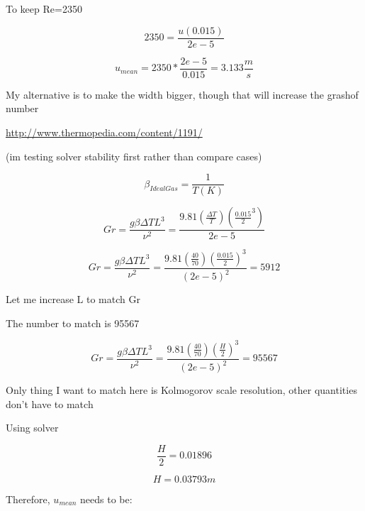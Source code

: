 \documentclass[12pt]{article}
\renewcommand{\_}{\kern-1.5pt\textunderscore\kern-1.5pt}
\begin{document}
To keep Re=2350\par

 \[ 2350=\frac{u \left( 0.015 \right) }{2e-5 } \] \par

 \[ u_{mean}=2350\ast\frac{2e-5}{0.015}=3.133\frac{m}{s} \] \par

My alternative is to make the width bigger, though that will increase the grashof number\par


\vspace{\baselineskip}
\href{http://www.thermopedia.com/content/1191/}{http://www.thermopedia.com/content/1191/}\par

(im testing solver stability first rather than compare cases)\par

 \[  \beta _{IdealGas}=\frac{1}{T \left( K \right) } \] \par

 \[ Gr=\frac{g \beta  \Delta TL^{3}}{ \nu ^{2}}=\frac{9.81 \left( \frac{ \Delta T}{T} \right)  \left( \frac{0.015}{2}^{3} \right) }{2e-5} \] \par

 \[ Gr=\frac{g \beta  \Delta TL^{3}}{ \nu ^{2}}=\frac{9.81 \left( \frac{40}{70} \right)  \left( \frac{0.015}{2} \right) ^{3}}{ \left( 2e-5 \right) ^{2}}=5912 \] \par

Let me increase L to match Gr\par

The number to match is 95567\par

 \[ Gr=\frac{g \beta  \Delta TL^{3}}{ \nu ^{2}}=\frac{9.81 \left( \frac{40}{70} \right)  \left( \frac{H}{2} \right) ^{3}}{ \left( 2e-5 \right) ^{2}}=95567 \] \par

Only thing I want to match here is Kolmogorov scale resolution, other quantities don’t have to match\par

Using solver\par

 \[ \frac{H}{2}=0.01896 \] \par

 \[ H=0.03793 m \] \par

Therefore,  \( u_{mean} \)  needs to be:\par
\end{document}
